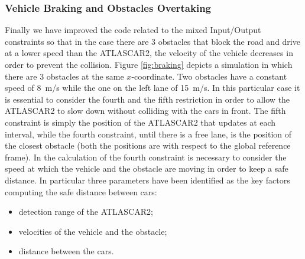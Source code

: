 \documentclass[conference,11pt]{IEEEtran}
\begin{document}
\subsubsection{Vehicle Braking and Obstacles Overtaking}
Finally we have improved the code related to the mixed Input/Output constraints so that in the case there are 3 obstacles that block the road and drive at a lower speed than the ATLASCAR2, the velocity of the vehicle decreases in order to prevent the collision. Figure \ref{fig:braking} depicts a simulation in which there are 3 obstacles at the same $x$-coordinate. Two obstacles have a constant speed of \SI{8}{m/s} while the one on the left lane of \SI{15}{m/s}.
In this particular case it is essential to consider the fourth and the fifth restriction in order to allow the ATLASCAR2 to slow down without colliding with the cars in front. The fifth constraint is simply the position of the ATLASCAR2 that updates at each interval, while the fourth constraint, until there is a free lane, is the position of the closest obstacle (both the positions are with respect to the global reference frame). In the calculation of the fourth constraint is necessary  to consider the speed at which the vehicle and the obstacle are moving in order to keep a safe distance. In particular three parameters have been identified as the key
factors computing the safe distance between cars:
\begin{itemize}
	\item detection range of the ATLASCAR2;
	\item velocities of the vehicle and the obstacle;
	\item distance between the cars.
\end{itemize}
\end{document}
